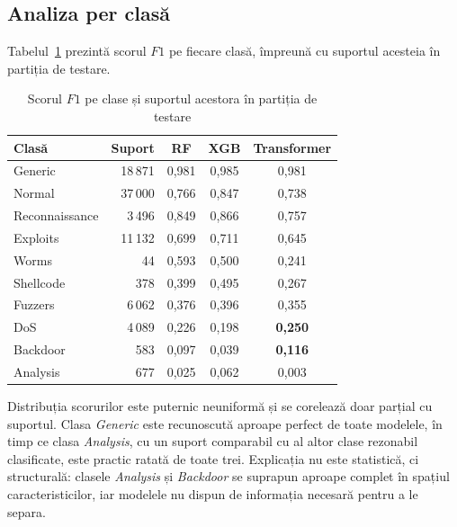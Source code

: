 \subsection{Analiza per clasă}\label{subsec:perclasa}

Tabelul~\ref{tab:perclasa} prezintă scorul $F1$ pe fiecare clasă, împreună cu suportul acesteia în partiția de testare.

\begin{table}[!ht]
    \caption{Scorul $F1$ pe clase și suportul acestora în partiția de testare}
    \centering
    \begin{tabular}{|l|r|c|c|c|}
        \hline
        \textbf{Clasă} & \textbf{Suport} & \textbf{RF} & \textbf{XGB} & \textbf{Transformer} \\
        \hline
        Generic & 18\,871 & 0,981 & 0,985 & 0,981 \\
        \hline
        Normal & 37\,000 & 0,766 & 0,847 & 0,738 \\
        \hline
        Reconnaissance & 3\,496 & 0,849 & 0,866 & 0,757 \\
        \hline
        Exploits & 11\,132 & 0,699 & 0,711 & 0,645 \\
        \hline
        Worms & 44 & 0,593 & 0,500 & 0,241 \\
        \hline
        Shellcode & 378 & 0,399 & 0,495 & 0,267 \\
        \hline
        Fuzzers & 6\,062 & 0,376 & 0,396 & 0,355 \\
        \hline
        DoS & 4\,089 & 0,226 & 0,198 & \textbf{0,250} \\
        \hline
        Backdoor & 583 & 0,097 & 0,039 & \textbf{0,116} \\
        \hline
        Analysis & 677 & 0,025 & 0,062 & 0,003 \\
        \hline
    \end{tabular}
    \label{tab:perclasa}
\end{table}

Distribuția scorurilor este puternic neuniformă și se corelează doar parțial cu suportul. Clasa \textit{Generic} este recunoscută aproape perfect de toate modelele, în timp ce clasa \textit{Analysis}, cu un suport comparabil cu al altor clase rezonabil clasificate, este practic ratată de toate trei. Explicația nu este statistică, ci structurală: clasele \textit{Analysis} și \textit{Backdoor} se suprapun aproape complet în spațiul caracteristicilor, iar modelele nu dispun de informația necesară pentru a le separa.

